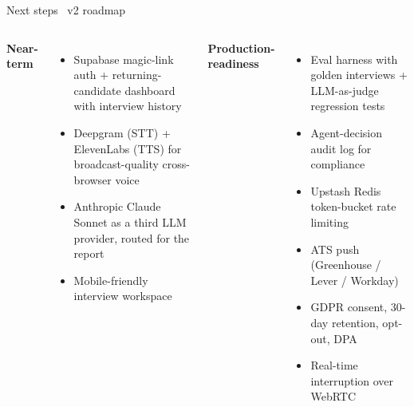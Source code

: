 \documentclass[aspectratio=169,10pt]{beamer}
\newcommand{\biglabel}[1]{\textcolor{brand}{\bfseries\large #1}}
\begin{document}
\begin{frame}{Next steps \textbullet\ v2 roadmap}
  \vspace{0.2cm}
  \footnotesize
  \begin{columns}[T,onlytextwidth]
      \biglabel{Near-term}
      \begin{itemize}\setlength\itemsep{2pt}
        \item Supabase magic-link auth + returning-candidate dashboard with interview history
        \item Deepgram (STT) + ElevenLabs (TTS) for broadcast-quality cross-browser voice
        \item Anthropic Claude Sonnet as a third LLM provider, routed for the report
        \item Mobile-friendly interview workspace
      \end{itemize}
      \biglabel{Production-readiness}
      \begin{itemize}\setlength\itemsep{2pt}
        \item Eval harness with golden interviews + LLM-as-judge regression tests
        \item Agent-decision audit log for compliance
        \item Upstash Redis token-bucket rate limiting
        \item ATS push (Greenhouse / Lever / Workday)
        \item GDPR consent, 30-day retention, opt-out, DPA
        \item Real-time interruption over WebRTC
      \end{itemize}
  \end{columns}
\end{frame}
\end{document}
